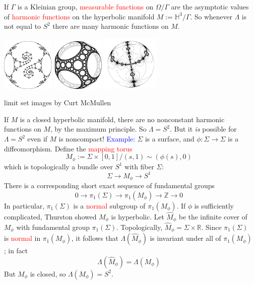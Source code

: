 \documentclass{beamer}
\def\Z{\mathbb{Z}}
\def\R{\mathbb{R}}
\def\H{\mathbb{H}}
\begin{document}
{
If $\Gamma$ is a Kleinian group, \textcolor{red}{measurable functions} on $\Omega/\Gamma$
are the asymptotic values of \textcolor{red}{harmonic functions} on the hyperbolic
manifold $M:=\H^3/\Gamma$.
\vskip 10pt
So whenever $\Lambda$ is not equal to $S^2$ there are many harmonic functions on $M$.
\begin{center}
\includegraphics[width=1in]{ctm_cusp.png}\hskip 13pt
\includegraphics[width=1in]{ctm_carpet.png}\hskip 8pt
\includegraphics[width=1.1in]{ctm_cylindrical.png}
\end{center}
\begin{center}
\small{limit set images by Curt McMullen}
\end{center}
}
\frame
{
If $M$ is a closed hyperbolic manifold, there are no nonconstant harmonic functions on $M$,
by the \textcolor{dgreen}{maximum principle}. So $\Lambda = S^2$.
\vskip 10pt
But it {\em is} possible for $\Lambda = S^2$ even if $M$ is noncompact!
}
\frame
{
\textcolor{blue}{Example:} $\Sigma$ is a surface, and $\phi:\Sigma \to \Sigma$ is
a diffeomorphism. Define the \textcolor{red}{mapping torus}
$$M_\phi:=\Sigma\times [0,1]/(s,1)\sim(\phi(s),0)$$
which is topologically a bundle over $S^1$ with fiber $\Sigma$:
$$\Sigma \to M_\phi \to S^1$$
}
\frame
{
There is a corresponding short exact sequence of fundamental groups
$$0 \to \pi_1(\Sigma) \to \pi_1(M_\phi) \to \Z \to 0$$
In particular, $\pi_1(\Sigma)$ is a \textcolor{red}{normal} subgroup of $\pi_1(M_\phi)$.
\vskip 10pt
If $\phi$ is sufficiently complicated, Thurston showed $M_\phi$ is hyperbolic.
}
\frame
{
Let $\widehat{M}_\phi$ be the infinite cover of $M_\phi$ with fundamental group
$\pi_1(\Sigma)$. Topologically, $\widehat{M}_\phi = \Sigma \times \R$.
\vskip 10pt
Since $\pi_1(\Sigma)$ is \textcolor{red}{normal} in $\pi_1(M_\phi)$, it follows that
$\Lambda(\widehat{M}_\phi)$ is invariant under all of $\pi_1(M_\phi)$; in fact
$$\Lambda(\widehat{M}_\phi) = \Lambda(M_\phi)$$
But $M_\phi$ is closed, so $\Lambda(M_\phi)=S^2$.
}
\end{document}
